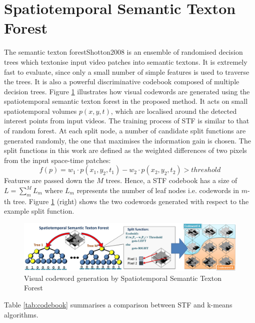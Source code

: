 \section{Spatiotemporal Semantic Texton Forest}
\label{sec:stf}
The semantic texton forest{Shotton2008} is an ensemble of randomised decision trees which textonise input video patches into semantic textons. It is extremely fast to evaluate, since only a small number of simple features is used to traverse the trees. It is also a powerful discriminative codebook composed of multiple decision trees. Figure \ref{img:stf} illustrates how visual codewords are generated using the spatiotemporal semantic texton forest in the proposed method. It acts on small spatiotemporal volumes $p(x,y,t)$, which are localised around the detected interest points from input videos. The training process of STF is similar to that of random forest. At each split node, a number of candidate split functions are generated randomly, the one that maximises the information gain is chosen. The split functions in this work are defined as the weighted differences of two pixels from the input space-time patches: 
\begin{equation}
\mathit{f}(p) = w_1 \cdot p(x_1,y_2,t_1) - w_2 \cdot p(x_2,y_2,t_2) > threshold
\end{equation}
Features are passed down the $M$ trees. Hence, a STF codebook has a size of $L=\sum_m^M L_m$  where $L_m$ represents the number of leaf nodes i.e. codewords in $m$-th tree. Figure \ref{img:stf} (right) shows the two codewords generated with respect to the example split function.
\begin{figure}
\includegraphics[width=1\linewidth]{fig/actreg/stf.pdf}%
\caption{Visual codeword generation by Spatiotemporal Semantic Texton Forest}
\label{img:stf}
\end{figure}
Table \ref{tab:codebook} summarises a comparison between STF and k-means algorithms.
